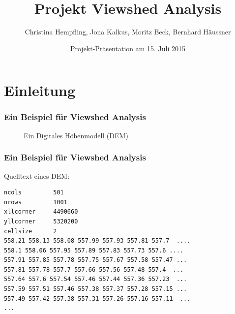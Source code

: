 \documentclass{beamer}
\begin{document}
\subject{Algorithmen für geographische Informationssysteme}
\title{Projekt Viewshed Analysis}
\author{Christina Hempfling, Jona Kalkus, Moritz Beck, Bernhard Häussner}
\date{Projekt-Präsentation am 15. Juli 2015}
\maketitle


\section{Einleitung}

\begin{frame}
  \frametitle{Ein Beispiel für Viewshed Analysis}
  \begin{figure}[h]
    \centering
    \caption{Ein Digitales Höhenmodell (DEM) }
    \label{fig:example}
  \end{figure}
\end{frame}

\begin{frame}[fragile]
  \frametitle{Ein Beispiel für Viewshed Analysis}
Quelltext eines DEM:
\begin{verbatim}
ncols         501
nrows         1001
xllcorner     4490660
yllcorner     5320200
cellsize      2
558.21 558.13 558.08 557.99 557.93 557.81 557.7  ....
558.1 558.06 557.95 557.89 557.83 557.73 557.6 ....
557.91 557.85 557.78 557.75 557.67 557.58 557.47 ...
557.81 557.78 557.7 557.66 557.56 557.48 557.4  ...
557.64 557.6 557.54 557.46 557.44 557.36 557.23  ...
557.59 557.51 557.46 557.38 557.37 557.28 557.15 ...
557.49 557.42 557.38 557.31 557.26 557.16 557.11  ...
...
\end{verbatim}

\end{frame}
\end{document}
